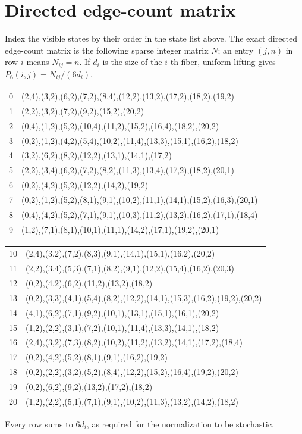 \documentclass[11pt]{article}
\begin{document}
\section*{Directed edge-count matrix}
Index the visible states by their order in the state list above.  The exact directed
edge-count matrix is the following sparse integer matrix \(N\); an entry \((j,n)\) in
row \(i\) means \(N_{ij}=n\).  If \(d_i\) is the size of the \(i\)-th fiber, uniform
lifting gives \(P_6(i,j)=N_{ij}/(6d_i)\).
\begin{center}
\scriptsize
\setlength{\tabcolsep}{2pt}
\begin{tabular}{c|l}
0&(2,4),(3,2),(6,2),(7,2),(8,4),(12,2),(13,2),(17,2),(18,2),(19,2)\\
1&(2,2),(3,2),(7,2),(9,2),(15,2),(20,2)\\
2&(0,4),(1,2),(5,2),(10,4),(11,2),(15,2),(16,4),(18,2),(20,2)\\
3&(0,2),(1,2),(4,2),(5,4),(10,2),(11,4),(13,3),(15,1),(16,2),(18,2)\\
4&(3,2),(6,2),(8,2),(12,2),(13,1),(14,1),(17,2)\\
5&(2,2),(3,4),(6,2),(7,2),(8,2),(11,3),(13,4),(17,2),(18,2),(20,1)\\
6&(0,2),(4,2),(5,2),(12,2),(14,2),(19,2)\\
7&(0,2),(1,2),(5,2),(8,1),(9,1),(10,2),(11,1),(14,1),(15,2),(16,3),(20,1)\\
8&(0,4),(4,2),(5,2),(7,1),(9,1),(10,3),(11,2),(13,2),(16,2),(17,1),(18,4)\\
9&(1,2),(7,1),(8,1),(10,1),(11,1),(14,2),(17,1),(19,2),(20,1)\\
\end{tabular}
\end{center}
\begin{center}
\scriptsize
\setlength{\tabcolsep}{2pt}
\begin{tabular}{c|l}
10&(2,4),(3,2),(7,2),(8,3),(9,1),(14,1),(15,1),(16,2),(20,2)\\
11&(2,2),(3,4),(5,3),(7,1),(8,2),(9,1),(12,2),(15,4),(16,2),(20,3)\\
12&(0,2),(4,2),(6,2),(11,2),(13,2),(18,2)\\
13&(0,2),(3,3),(4,1),(5,4),(8,2),(12,2),(14,1),(15,3),(16,2),(19,2),(20,2)\\
14&(4,1),(6,2),(7,1),(9,2),(10,1),(13,1),(15,1),(16,1),(20,2)\\
15&(1,2),(2,2),(3,1),(7,2),(10,1),(11,4),(13,3),(14,1),(18,2)\\
16&(2,4),(3,2),(7,3),(8,2),(10,2),(11,2),(13,2),(14,1),(17,2),(18,4)\\
17&(0,2),(4,2),(5,2),(8,1),(9,1),(16,2),(19,2)\\
18&(0,2),(2,2),(3,2),(5,2),(8,4),(12,2),(15,2),(16,4),(19,2),(20,2)\\
19&(0,2),(6,2),(9,2),(13,2),(17,2),(18,2)\\
20&(1,2),(2,2),(5,1),(7,1),(9,1),(10,2),(11,3),(13,2),(14,2),(18,2)
\end{tabular}
\end{center}
Every row sums to \(6d_i\), as required for the normalization to be stochastic.
\end{document}
